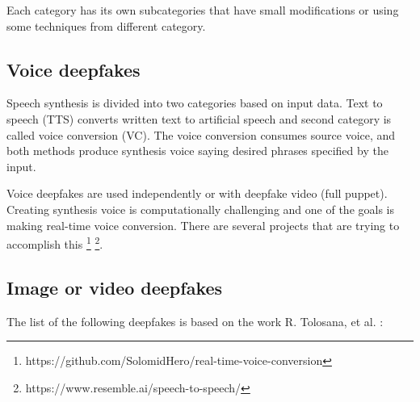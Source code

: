 Each category has its own subcategories that have small modifications or using some techniques from different category. 

\subsection{Voice deepfakes}

Speech synthesis is divided into two categories based on input data. Text to speech (TTS) converts written text to artificial speech and second category is called voice conversion (VC). The voice conversion consumes source voice, and both methods produce synthesis voice saying desired phrases specified by the input. \cite{ApplicabilityOfDeepfakes}

Voice deepfakes are used independently or with deepfake video (full puppet). Creating synthesis voice is computationally challenging and one of the goals is making real-time voice conversion. There are several projects that are trying to accomplish this \footnote{https://github.com/SolomidHero/real-time-voice-conversion} \footnote{https://www.resemble.ai/speech-to-speech/}.

\subsection{Image or video deepfakes}

The list of the following deepfakes is based on the work R. Tolosana, et al. \cite{IntroductionToDigitalFaceManipulation}:

